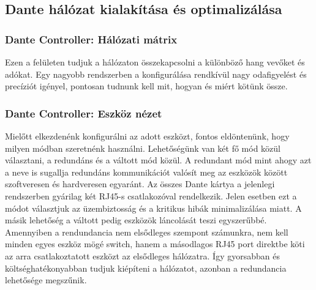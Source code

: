 \subsection{Dante hálózat kialakítása és optimalizálása}
\subsubsection{Dante Controller: Hálózati mátrix}
Ezen a felületen tudjuk a hálózaton összekapcsolni a különböző hang vevőket és
adókat. Egy nagyobb rendszerben a konfigurálása rendkívül nagy odafigyelést és
precíziót igényel, pontosan tudnunk kell mit, hogyan és miért kötünk össze.
\subsubsection{Dante Controller: Eszköz nézet}
Mielőtt elkezdenénk konfigurálni az adott eszközt, fontos eldöntenünk, hogy
milyen módban szeretnénk használni.
Lehetőségünk van két fő mód közül választani, a redundáns és a
váltott mód közül. A redundant mód mint ahogy azt a neve is sugallja
redundáns kommunikációt valósít meg az eszközök között szoftveresen és
hardveresen egyaránt. Az összes Dante kártya a jelenlegi rendszerben gyárilag két RJ45-s
csatlakozóval rendelkezik. Jelen esetben ezt a módot választjuk az
üzembiztosság és a kritikus hibák minimalizálása miatt.
A másik lehetőség a váltott pedig eszközök láncolását
teszi egyszerűbbé. Amennyiben a rendundancia nem elsődleges szempont számunkra, nem kell
minden egyes eszköz mögé switch, hanem a másodlagos RJ45 port direktbe köti
az arra csatlakoztatott eszközt az elsődleges hálózatra. Így gyorsabban és
költséghatékonyabban tudjuk kiépíteni a hálózatot, azonban a redundancia lehetősége megszűnik.
